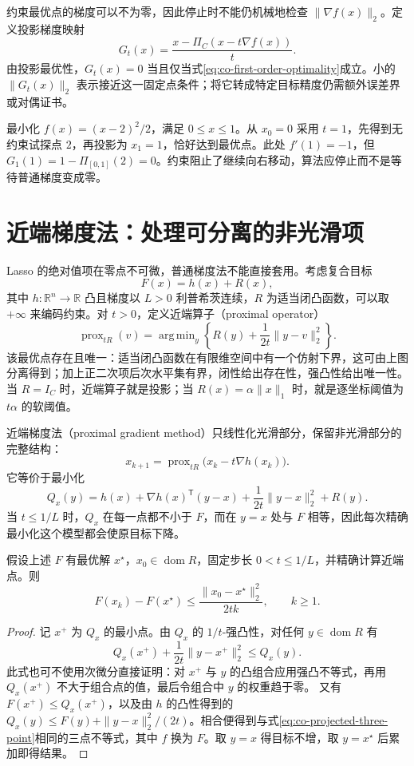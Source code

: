 约束最优点的梯度可以不为零，因此停止时不能仍机械地检查 $\|\nabla f(x)\|_2$。定义投影梯度映射
\[
 G_t(x)=\frac{x-\Pi_C(x-t\nabla f(x))}{t}.
\]
由投影最优性，$G_t(x)=0$ 当且仅当式\eqref{eq:co-first-order-optimality}成立。小的 $\|G_t(x)\|_2$ 表示接近这一固定点条件；将它转成特定目标精度仍需额外误差界或对偶证书。

\begin{example}[边界最优点的梯度不消失]
最小化 $f(x)=(x-2)^2/2$，满足 $0\leq x\leq1$。从 $x_0=0$ 采用 $t=1$，先得到无约束试探点 $2$，再投影为 $x_1=1$，恰好达到最优点。此处 $f'(1)=-1$，但 $G_1(1)=1-\Pi_{[0,1]}(2)=0$。约束阻止了继续向右移动，算法应停止而不是等待普通梯度变成零。
\end{example}

\section{近端梯度法：处理可分离的非光滑项}
\label{sec:co-proximal-gradient}

Lasso 的绝对值项在零点不可微，普通梯度法不能直接套用。考虑复合目标
\[
 F(x)=h(x)+R(x),
\]
其中 $h:\mathbb R^n\to\mathbb R$ 凸且梯度以 $L>0$ 利普希茨连续，$R$ 为适当闭凸函数，可以取 $+\infty$ 来编码约束。对 $t>0$，定义近端算子（proximal operator）
\[
 \operatorname{prox}_{tR}(v)
 =\mathop{\mathrm{arg\,min}}_y
 \left\{R(y)+\frac1{2t}\|y-v\|_2^2\right\}.
\]
该最优点存在且唯一：适当闭凸函数在有限维空间中有一个仿射下界，这可由上图分离得到；加上正二次项后次水平集有界，闭性给出存在性，强凸性给出唯一性。当 $R=I_C$ 时，近端算子就是投影；当 $R(x)=\alpha\|x\|_1$ 时，就是逐坐标阈值为 $t\alpha$ 的软阈值。

近端梯度法（proximal gradient method）只线性化光滑部分，保留非光滑部分的完整结构：
\begin{equation}
 x_{k+1}=\operatorname{prox}_{tR}\bigl(x_k-t\nabla h(x_k)\bigr).
 \label{eq:co-proximal-gradient}
\end{equation}
它等价于最小化
\[
 Q_x(y)=h(x)+\nabla h(x)^{\mathsf T}(y-x)
             +\frac1{2t}\|y-x\|_2^2+R(y).
\]
当 $t\leq1/L$ 时，$Q_x$ 在每一点都不小于 $F$，而在 $y=x$ 处与 $F$ 相等，因此每次精确最小化这个模型都会使原目标下降。

\begin{proposition}[近端梯度法的基本收敛界]
假设上述 $F$ 有最优解 $x^\star$，$x_0\in\operatorname{dom}R$，固定步长 $0<t\leq1/L$，并精确计算近端点。则
\[
 F(x_k)-F(x^\star)\leq\frac{\|x_0-x^\star\|_2^2}{2tk},
 \qquad k\geq1.
\]
\end{proposition}
\begin{proof}
记 $x^+$ 为 $Q_x$ 的最小点。由 $Q_x$ 的 $1/t$-强凸性，对任何 $y\in\operatorname{dom}R$ 有
\[
 Q_x(x^+)+\frac1{2t}\|y-x^+\|_2^2\leq Q_x(y).
\]
此式也可不使用次微分直接证明：对 $x^+$ 与 $y$ 的凸组合应用强凸不等式，再用 $Q_x(x^+)$ 不大于组合点的值，最后令组合中 $y$ 的权重趋于零。
又有 $F(x^+)\leq Q_x(x^+)$，以及由 $h$ 的凸性得到的
$Q_x(y)\leq F(y)+\|y-x\|_2^2/(2t)$。相合便得到与式\eqref{eq:co-projected-three-point}相同的三点不等式，其中 $f$ 换为 $F$。取 $y=x$ 得目标不增，取 $y=x^\star$ 后累加即得结果。
\end{proof}

